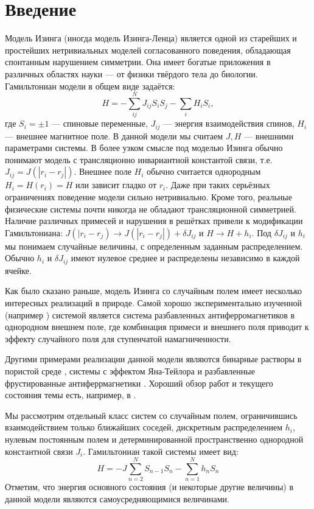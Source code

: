\section{Введение}
	Модель Изинга (иногда модель Изинга-Ленца)  является одной из старейших и простейших нетривиальных моделей согласованного поведения, обладающая спонтанным нарушением симметрии. Она имеет богатые приложения в различных областях науки –– от физики твёрдого тела до биологии. Гамильтониан модели в общем виде задаётся:
	\begin{equation}
		H = - \sum_{ij}^N J_{ij}	S_i S_j - \sum_{i} H_i S_i,
	\end{equation}
	где $S_i = \pm 1$ –– спиновые переменные, $J_{ij}$ –– энергия взаимодействия спинов, $H_i$ –– внешнее магнитное поле. В данной модели мы считаем $J,H$ –– внешними параметрами системы. В более узком смысле под моделью Изинга обычно понимают модель с трансляционно инвариантной константой связи, т.е. $J_{ij} = J(|r_i - r_j|)$.
	 Внешнее поле $H_i$ обычно считается однородным $H_i = H(r_i) = H$ или зависит гладко от $r_i$.
	 Даже при таких серьёзных ограничениях поведение модели сильно нетривиально. Кроме того,  реальные физические системы почти никогда не обладают трансляционной симметрией.
	 Наличие различных примесей и нарушения в решётках привели к модификации Гамильтониана: $J(|r_i-r_j) \to J(|r_i-r_j|) + \delta J_{ij}$ и $H \to H + h_i$. Под $\delta J_{ij}$ и $h_i$  мы понимаем случайные величины, с определенным заданным распределением. Обычно $h_i$ и $\delta J_{ij}$ имеют нулевое среднее и распределены независимо в каждой ячейке.

	Как было сказано раньше, модель Изинга со случайным полем имеет несколько интересных реализаций в природе. Самой хорошо экспериментально изученной (например \cite{fishman}) системой является система разбавленных антиферромагнетиков  в однородном внешнем поле, где комбинация примеси и внешнего поля приводит к эффекту случайного поля для ступенчатой намагниченности.

	Другими примерами реализации данной модели являются бинарные растворы в пористой среде \cite{de1984liquid}, системы с эффектом Яна-Тейлора \cite{graham1987random} и разбавленные фрустированные антиферрмагнетики \cite{fernandez1988random}. Хороший обзор работ и текущего состояния темы есть, например, в \cite{nattermann1998theory}.
	
	Мы рассмотрим отдельный класс систем со случайным полем, ограничившись взаимодействием только ближайших соседей, дискретным распределением $h_i$, нулевым постоянным полем и детерминированной пространственно однородной константной связи $J_i$. Гамильтониан такой системы имеет вид:
	\begin{equation}
		H = - J \sum_{n=2}^{N} S_{n-1} S_n - \sum_{n=1}^N h_n S_n
	\end{equation}
	Отметим, что энергия основного состояния (и некоторые другие величины) в данной модели являются самоусредняющимися величинами.
	
